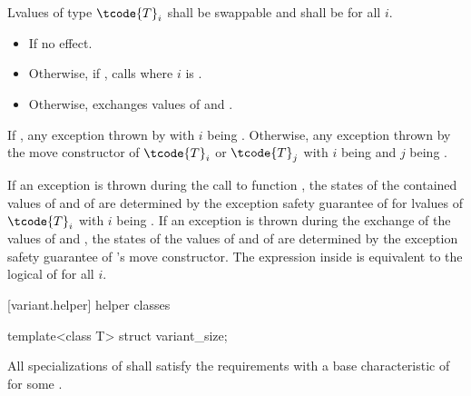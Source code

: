 \begin{itemdescr}
\pnum
\requires Lvalues of type $\tcode{T}_i$ shall be swappable and
 shall be  for all $i$.

\pnum
\effects
\begin{itemize}
\item
If  no effect.
\item
Otherwise, if , calls  where $i$ is .
\item
Otherwise, exchanges values of  and .
\end{itemize}

\pnum
\throws
If ,
any exception thrown by 
with $i$ being .
Otherwise, any exception thrown by the move constructor
of $\tcode{T}_i$ or $\tcode{T}_j$
with $i$ being  and $j$ being .

\pnum
\remarks
If an exception is thrown during the call to function ,
the states of the contained values of  and of  are
determined by the exception safety guarantee of  for lvalues of
$\tcode{T}_i$ with $i$ being .
If an exception is thrown during the exchange of the values of 
and , the states of the values of  and of 
are determined by the exception safety guarantee of 's move constructor.
The expression inside  is equivalent to the logical  of
 for all $i$.
\end{itemdescr}

[variant.helper]{ helper classes}

%
\begin{itemdecl}
template<class T> struct variant_size;
\end{itemdecl}

\begin{itemdescr}
\pnum
\remarks
All specializations of  shall satisfy the
 requirements
with a base characteristic of  for some .
\end{itemdescr}

